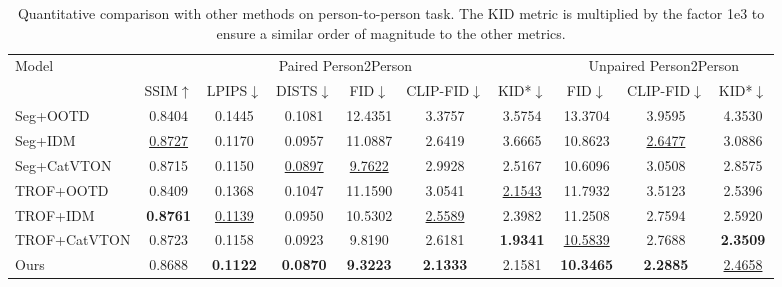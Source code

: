 
\begin{table*}[htbp]
\centering
\begin{tabular}{l|cccccc|ccc}
\toprule
\multirow{2}{*}{Model} & \multicolumn{6}{c|}{Paired Person2Person}            & \multicolumn{3}{c}{Unpaired Person2Person} \\ \cmidrule(){2-10} 
                       & SSIM$\uparrow$    & LPIPS$\downarrow$  & DISTS$\downarrow$  & FID$\downarrow$     & CLIP-FID$\downarrow$ & KID*$\downarrow$    & FID$\downarrow$             & CLIP-FID$\downarrow$       & KID*$\downarrow$          \\ \midrule
Seg+OOTD             & 0.8404 & 0.1445 & 0.1081 & 12.4351  & 3.3757 & 3.5754      & 13.3704   & 3.9595        & 4.3530       \\
Seg+IDM              & \underline{0.8727} & 0.1170 & 0.0957 & 11.0887  & 2.6419 & 3.6665      & 10.8623  & \underline{2.6477}       & 3.0886       \\
Seg+CatVTON     & 0.8715 & 0.1150 & \underline{0.0897} & \underline{9.7622}  & 2.9928 & 2.5167      & 10.6096  & 3.0508       & 2.8575       \\ \midrule
TROF+OOTD            & 0.8409 & 0.1368 & 0.1047 & 11.1590  & 3.0541 & \underline{2.1543}     & 11.7932   & 3.5123       & 2.5396       \\
TROF+IDM             & \textbf{0.8761} & \underline{0.1139} & 0.0950 & 10.5302  & \underline{2.5589} & 2.3982      & 11.2508  & 2.7594       & 2.5920      \\
TROF+CatVTON    & 0.8723 & 0.1158 & 0.0923 & 9.8190  & 2.6181 & \textbf{1.9341}       & \underline{10.5839}  & 2.7688        & \textbf{2.3509}       \\  \midrule
Ours                 & 0.8688 & \textbf{0.1122} & \textbf{0.0870} & \textbf{9.3223} & \textbf{2.1333}   & 2.1581  & \textbf{10.3465}         & \textbf{2.2885}        & \underline{2.4658}      \\ \bottomrule
\end{tabular}
\caption{Quantitative comparison with other methods on person-to-person task. The KID metric is multiplied by the factor 1e3 to ensure a similar order of magnitude to the other metrics.}
\label{tab:quantitative_person}
\end{table*}








